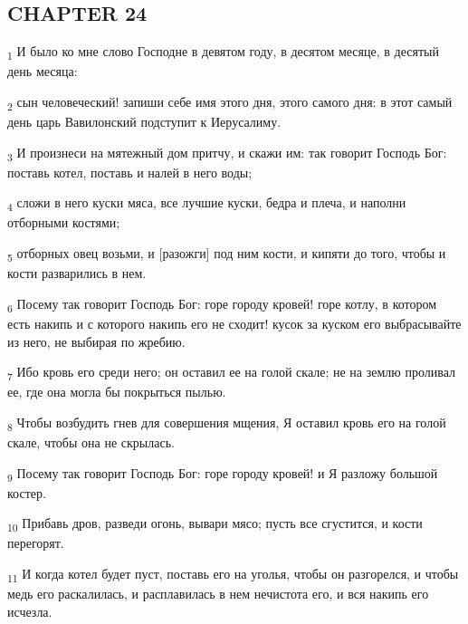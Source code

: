 \subsection{CHAPTER 24}
\begin{tcolorbox}
\textsubscript{1} И было ко мне слово Господне в девятом году, в десятом месяце, в десятый день месяца:
\end{tcolorbox}
\begin{tcolorbox}
\textsubscript{2} сын человеческий! запиши себе имя этого дня, этого самого дня: в этот самый день царь Вавилонский подступит к Иерусалиму.
\end{tcolorbox}
\begin{tcolorbox}
\textsubscript{3} И произнеси на мятежный дом притчу, и скажи им: так говорит Господь Бог: поставь котел, поставь и налей в него воды;
\end{tcolorbox}
\begin{tcolorbox}
\textsubscript{4} сложи в него куски мяса, все лучшие куски, бедра и плеча, и наполни отборными костями;
\end{tcolorbox}
\begin{tcolorbox}
\textsubscript{5} отборных овец возьми, и [разожги] под ним кости, и кипяти до того, чтобы и кости разварились в нем.
\end{tcolorbox}
\begin{tcolorbox}
\textsubscript{6} Посему так говорит Господь Бог: горе городу кровей! горе котлу, в котором есть накипь и с которого накипь его не сходит! кусок за куском его выбрасывайте из него, не выбирая по жребию.
\end{tcolorbox}
\begin{tcolorbox}
\textsubscript{7} Ибо кровь его среди него; он оставил ее на голой скале; не на землю проливал ее, где она могла бы покрыться пылью.
\end{tcolorbox}
\begin{tcolorbox}
\textsubscript{8} Чтобы возбудить гнев для совершения мщения, Я оставил кровь его на голой скале, чтобы она не скрылась.
\end{tcolorbox}
\begin{tcolorbox}
\textsubscript{9} Посему так говорит Господь Бог: горе городу кровей! и Я разложу большой костер.
\end{tcolorbox}
\begin{tcolorbox}
\textsubscript{10} Прибавь дров, разведи огонь, вывари мясо; пусть все сгустится, и кости перегорят.
\end{tcolorbox}
\begin{tcolorbox}
\textsubscript{11} И когда котел будет пуст, поставь его на уголья, чтобы он разгорелся, и чтобы медь его раскалилась, и расплавилась в нем нечистота его, и вся накипь его исчезла.
\end{tcolorbox}
